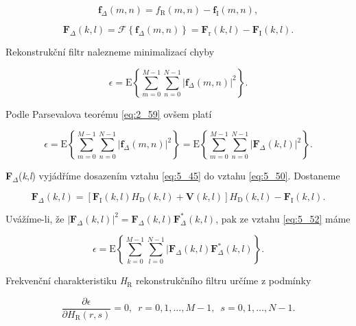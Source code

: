 \begin{equation} \label{eq:5_49}
    \mathbf{f}_\Delta (m, n) = f_\mathrm{R} (m, n) - \mathbf{f}_\mathrm{I} (m, n),
\end{equation}

\begin{equation} \label{eq:5_50}
    \mathbf{F}_\Delta (k, l) = \mathscr{F} \left\{ \mathbf{f}_\Delta (m, n) \right\} = \mathbf{F}_\mathrm{r} (k, l) - \mathbf{F}_\mathrm{I}(k, l).
\end{equation}

Rekonstrukční filtr nalezneme minimalizací chyby

\begin{equation} \label{eq:5_51}
    \epsilon = \mathrm{E} \left\{ \sum\limits_{m=0}^{M-1} \sum\limits_{n=0}^{N-1} | \mathbf{f}_\Delta (m, n) |^2 \right\}.
\end{equation}

Podle Parsevalova teorému \eqref{eq:2_59} ovšem platí

\begin{equation} \label{eq:5_52}
    \epsilon = \mathrm{E} \left\{ \sum\limits_{m=0}^{M-1} \sum\limits_{n=0}^{N-1} | \mathbf{f}_\Delta (m, n) |^2 \right\} = \mathrm{E} \left\{ \sum\limits_{m=0}^{M-1} \sum\limits_{n=0}^{N-1} | \mathbf{F}_\Delta (k, l) |^2 \right\}.
\end{equation}

\textbf{F}$_\Delta$(\textit{k},\textit{l}) vyjádříme dosazením vztahu \eqref{eq:5_45} do vztahu \eqref{eq:5_50}. Dostaneme

\begin{equation} \label{eq:5_53}
    \mathbf{F}_\Delta (k, l) = \left[ \mathbf{F}_\mathrm{I} (k, l) H_\mathrm{D} (k, l) + \mathbf{V}(k, l) \right] H_\mathrm{D}(k, l) - \mathbf{F}_\mathrm{I}(k, l).
\end{equation}

Uvážíme-li, že $|\mathbf{F}_\Delta(k, l)|^2 = \mathbf{F}_\Delta(k, l)\mathbf{F}_\Delta^*(k, l)$, pak ze vztahu \eqref{eq:5_52} máme

\begin{equation} \label{eq:5_54}
    \epsilon = \mathrm{E} \left\{ \sum\limits_{k=0}^{M-1} \sum\limits_{l=0}^{N-1} | \mathbf{F}_\Delta (k, l) \mathbf{F}_\Delta^* (k, l) \right\}.
\end{equation}

Frekvenční charakteristiku \textit{H}$_\mathrm{R}$ rekonstrukčního filtru určíme z podmínky

\begin{equation} \label{eq:5_55}
    \frac{\partial\epsilon}{\partial H_\mathrm{R}(r, s)} = 0, \,\,\, r = 0, 1, \dots, M-1, \,\,\, s = 0, 1, \dots, N-1.
\end{equation}

